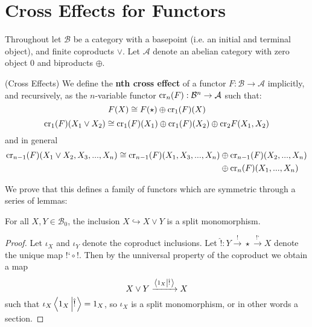 \section{Cross Effects for Functors}

Throughout let $\mathcal{B}$ be a category with a basepoint (i.e. an initial and terminal object), and finite coproducts $\lor$. Let $\mathcal{A}$ denote an abelian category with zero object $0$ and biproducts $\oplus$.

\begin{defn}[label=defn:crossEffect]{(Cross Effects)}
    We define the \textbf{nth cross effect} of a functor $F:\mathcal{B}\rightarrow \mathcal{A}$ implicitly, and recursively, as the $n$-variable functor $\text{cr}_n(F):\mathcal{B}^n\rightarrow \mathcal{A}$ such that:
    \begin{equation*}
        F(X) \cong F(\star)\oplus \text{cr}_1(F)(X)
    \end{equation*}
    \begin{equation*}
        \text{cr}_1(F)(X_1\lor X_2) \cong \text{cr}_1(F)(X_1)\oplus \text{cr}_1(F)(X_2)\oplus \text{cr}_2F(X_1,X_2)
    \end{equation*}
    and in general
    \begin{align*}
        \text{cr}_{n-1}(F)(X_1\lor X_2,X_3,...,X_n)\cong \text{cr}_{n-1}(F)(X_1,X_3,...,X_n)&\oplus \text{cr}_{n-1}(F)(X_2,...,X_n) \\
        &\oplus \text{cr}_n(F)(X_1,...,X_n)
    \end{align*}
\end{defn}

We prove that this defines a family of functors which are symmetric through a series of lemmas:

\begin{lem}[label=lem:coprodMono]
    For all $X,Y \in \mathcal{B}_0$, the inclusion $X\hookrightarrow X\lor Y$ is a split monomorphism.
\end{lem}
\begin{proof}
    Let $\iota_X$ and $\iota_Y$ denote the coproduct inclusions. Let $\hat{!}:Y\xrightarrow{!} \star\xrightarrow{\text{!`}} X$ denote the unique map $\text{!`}\circ !$. Then by the unniversal property of the coproduct we obtain a map
    \begin{equation*}
        X\lor Y\xrightarrow{\left\langle 1_X\left|\hat{!}\right.\right\rangle}X
    \end{equation*}
    such that $\iota_X\left\langle 1_X\left|\hat{!}\right.\right\rangle = 1_X$, so $\iota_X$ is a split monomorphism, or in other words a section.
\end{proof}

